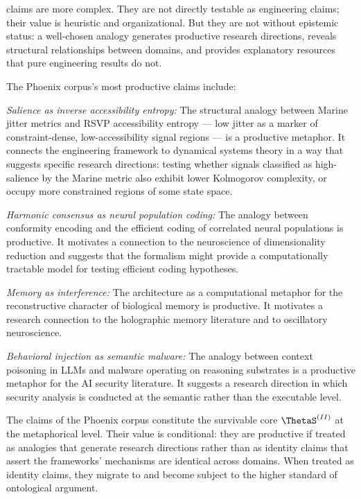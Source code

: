 \LevelII{} claims are more complex. They are not directly
testable as engineering claims; their value is heuristic
and organizational. But they are not without epistemic
status: a well-chosen analogy generates productive
research directions, reveals structural relationships
between domains, and provides explanatory resources
that pure engineering results do not.

The Phoenix corpus's most productive \LevelII{} claims include:

\textit{Salience as inverse accessibility entropy:}
The structural analogy between Marine jitter metrics
and RSVP accessibility entropy --- low jitter as a
marker of constraint-dense, low-accessibility signal
regions --- is a productive metaphor. It connects the
engineering framework to dynamical systems theory in
a way that suggests specific research directions: testing
whether signals classified as high-salience by the Marine
metric also exhibit lower Kolmogorov complexity, or
occupy more constrained regions of some state space.

\textit{Harmonic consensus as neural population coding:}
The analogy between \HCFone{} conformity encoding and
the efficient coding of correlated neural populations
is productive. It motivates a connection to the
neuroscience of dimensionality reduction and suggests
that the \HCFone{} formalism might provide a computationally
tractable model for testing efficient coding hypotheses.

\textit{Memory as interference:} The \MEMeight{}
architecture as a computational metaphor for the
reconstructive character of biological memory is
productive. It motivates a research connection to
the holographic memory literature and to oscillatory
neuroscience.

\textit{Behavioral injection as semantic malware:}
The analogy between context poisoning in LLMs and
malware operating on reasoning substrates is a
productive metaphor for the AI security literature.
It suggests a research direction in which security
analysis is conducted at the semantic rather than
the executable level.

\begin{auditprop}
\label{ap:level2-productive}
The \LevelII{} claims of the Phoenix corpus constitute
the survivable core $\ThetaS^{(II)}$ at the metaphorical
level. Their value is conditional: they are productive
if treated as analogies that generate research directions
rather than as identity claims that assert the frameworks'
mechanisms are identical across domains. When treated
as identity claims, they migrate to \LevelIV{} and
become subject to the higher standard of ontological
argument.
\end{auditprop}

